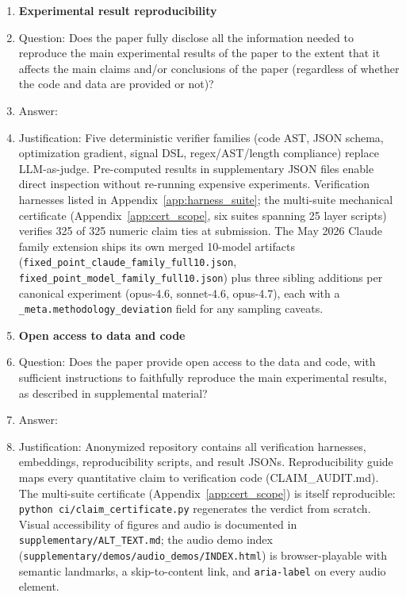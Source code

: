 \begin{enumerate}
\item {\bf Experimental result reproducibility}
    \item[] Question: Does the paper fully disclose all the information needed to reproduce the main experimental results of the paper to the extent that it affects the main claims and/or conclusions of the paper (regardless of whether the code and data are provided or not)?
    \item[] Answer: \answerYes{}
    \item[] Justification: Five deterministic verifier families (code AST, JSON schema, optimization gradient, signal DSL, regex/AST/length compliance) replace LLM-as-judge. Pre-computed results in supplementary JSON files enable direct inspection without re-running expensive experiments. Verification harnesses listed in Appendix~\ref{app:harness_suite}; the multi-suite mechanical certificate (Appendix~\ref{app:cert_scope}, six suites spanning 25 layer scripts) verifies 325 of 325 numeric claim ties at submission. The May 2026 Claude family extension ships its own merged 10-model artifacts (\texttt{fixed\_point\_claude\_family\_full10.json}, \texttt{fixed\_point\_model\_family\_full10.json}) plus three sibling additions per canonical experiment (opus-4.6, sonnet-4.6, opus-4.7), each with a \texttt{\_meta.methodology\_deviation} field for any sampling caveats.

\item {\bf Open access to data and code}
    \item[] Question: Does the paper provide open access to the data and code, with sufficient instructions to faithfully reproduce the main experimental results, as described in supplemental material?
    \item[] Answer: \answerYes{}
    \item[] Justification: Anonymized repository contains all verification harnesses, embeddings, reproducibility scripts, and result JSONs. Reproducibility guide maps every quantitative claim to verification code (CLAIM\_AUDIT.md). The multi-suite certificate (Appendix~\ref{app:cert_scope}) is itself reproducible: \texttt{python ci/claim\_certificate.py} regenerates the verdict from scratch. Visual accessibility of figures and audio is documented in \texttt{supplementary/ALT\_TEXT.md}; the audio demo index (\texttt{supplementary/demos/audio\_demos/INDEX.html}) is browser-playable with semantic landmarks, a skip-to-content link, and \texttt{aria-label} on every audio element.


\end{enumerate}
